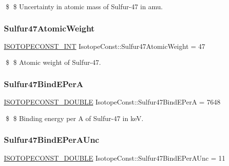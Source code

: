 \$ \$ Uncertainty in atomic mass of Sulfur-\/47 in amu. \mbox{\label{group___isotope_const-_sulfur-_s47_ga34619f0bb42a39be69a0db40ce675fcf}} 
\subsubsection{\texorpdfstring{Sulfur47\+Atomic\+Weight}{Sulfur47AtomicWeight}}
{\footnotesize\ttfamily \mbox{\hyperlink{group___isotope_const-_macros_ga5f18360b3e99483a35c32d789e62621c}{I\+S\+O\+T\+O\+P\+E\+C\+O\+N\+S\+T\+\_\+\+I\+NT}} Isotope\+Const\+::\+Sulfur47\+Atomic\+Weight = 47}

\$ \$ Atomic weight of Sulfur-\/47. \mbox{\label{group___isotope_const-_sulfur-_s47_gad97ba99a541bd4d272291942c38d2fa4}} 
\subsubsection{\texorpdfstring{Sulfur47\+Bind\+E\+PerA}{Sulfur47BindEPerA}}
{\footnotesize\ttfamily \mbox{\hyperlink{group___isotope_const-_macros_ga8f45a7272ce02c0b4c65c44636ed719a}{I\+S\+O\+T\+O\+P\+E\+C\+O\+N\+S\+T\+\_\+\+D\+O\+U\+B\+LE}} Isotope\+Const\+::\+Sulfur47\+Bind\+E\+PerA = 7648}

\$ \$ Binding energy per A of Sulfur-\/47 in keV. \mbox{\label{group___isotope_const-_sulfur-_s47_ga12e1e715ddb2aa0112dd3c4e37c50627}} 
\subsubsection{\texorpdfstring{Sulfur47\+Bind\+E\+Per\+A\+Unc}{Sulfur47BindEPerAUnc}}
{\footnotesize\ttfamily \mbox{\hyperlink{group___isotope_const-_macros_ga8f45a7272ce02c0b4c65c44636ed719a}{I\+S\+O\+T\+O\+P\+E\+C\+O\+N\+S\+T\+\_\+\+D\+O\+U\+B\+LE}} Isotope\+Const\+::\+Sulfur47\+Bind\+E\+Per\+A\+Unc = 11}

